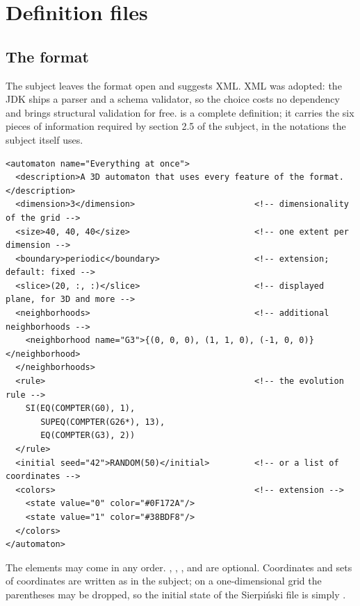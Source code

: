 \section{Definition files}
\label{sec:definitions}

\subsection{The format}

The subject leaves the format open and suggests XML. XML was adopted: the JDK ships a parser and
a schema validator, so the choice costs no dependency and brings structural validation for free.
 is a complete definition; it carries the six pieces of information required
by section 2.5 of the subject, in the notations the subject itself uses.

\begin{lstlisting}[style=xml, caption={A definition file using every feature of the format.},
  label={lst:definition}, captionpos=b]
<automaton name="Everything at once">
  <description>A 3D automaton that uses every feature of the format.</description>
  <dimension>3</dimension>                        <!-- dimensionality of the grid -->
  <size>40, 40, 40</size>                         <!-- one extent per dimension -->
  <boundary>periodic</boundary>                   <!-- extension; default: fixed -->
  <slice>(20, :, :)</slice>                       <!-- displayed plane, for 3D and more -->
  <neighborhoods>                                 <!-- additional neighborhoods -->
    <neighborhood name="G3">{(0, 0, 0), (1, 1, 0), (-1, 0, 0)}</neighborhood>
  </neighborhoods>
  <rule>                                          <!-- the evolution rule -->
    SI(EQ(COMPTER(G0), 1),
       SUPEQ(COMPTER(G26*), 13),
       EQ(COMPTER(G3), 2))
  </rule>
  <initial seed="42">RANDOM(50)</initial>         <!-- or a list of coordinates -->
  <colors>                                        <!-- extension -->
    <state value="0" color="#0F172A"/>
    <state value="1" color="#38BDF8"/>
  </colors>
</automaton>
\end{lstlisting}

The elements may come in any order. , , ,
 and  are optional. Coordinates and sets of coordinates are
written as in the subject; on a one-dimensional grid the parentheses may be dropped, so the
initial state of the Sierpi\'nski file is simply .

